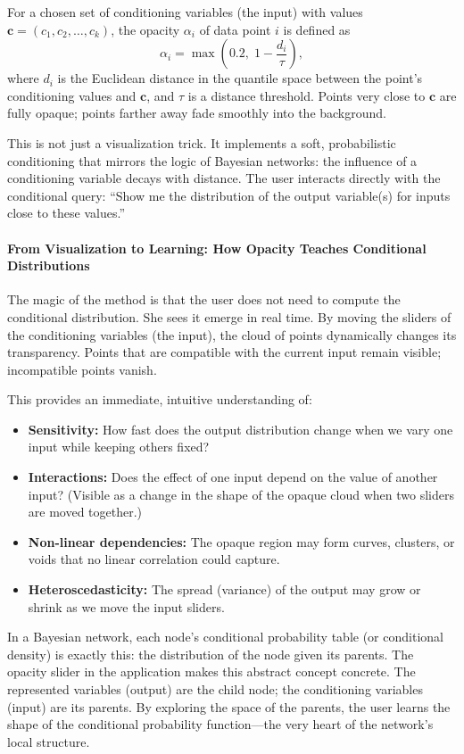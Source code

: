For a chosen set of conditioning variables (the input) with values \(\mathbf{c} = (c_1,c_2,\dots,c_k)\), the opacity \(\alpha_i\) of data point \(i\) is defined as
\[
\alpha_i = \max\!\left(0.2,\; 1-\frac{d_i}{\tau}\right),
\]
where \(d_i\) is the Euclidean distance in the quantile space between the point’s conditioning values and \(\mathbf{c}\), and \(\tau\) is a distance threshold. Points very close to \(\mathbf{c}\) are fully opaque; points farther away fade smoothly into the background.

This is not just a visualization trick. It implements a soft, probabilistic conditioning that mirrors the logic of Bayesian networks: the influence of a conditioning variable decays with distance. The user interacts directly with the conditional query: “Show me the distribution of the output variable(s) for inputs close to these values.”

\paragraph{From Visualization to Learning: How Opacity Teaches Conditional Distributions}
The magic of the method is that the user does not need to compute the conditional distribution. She sees it emerge in real time. By moving the sliders of the conditioning variables (the input), the cloud of points dynamically changes its transparency. Points that are compatible with the current input remain visible; incompatible points vanish.

This provides an immediate, intuitive understanding of:
\begin{itemize}
\item \textbf{Sensitivity:} How fast does the output distribution change when we vary one input while keeping others fixed?
\item \textbf{Interactions:} Does the effect of one input depend on the value of another input? (Visible as a change in the shape of the opaque cloud when two sliders are moved together.)
\item \textbf{Non-linear dependencies:} The opaque region may form curves, clusters, or voids that no linear correlation could capture.
\item \textbf{Heteroscedasticity:} The spread (variance) of the output may grow or shrink as we move the input sliders.
\end{itemize}

In a Bayesian network, each node’s conditional probability table (or conditional density) is exactly this: the distribution of the node given its parents. The opacity slider in the application makes this abstract concept concrete. The represented variables (output) are the child node; the conditioning variables (input) are its parents. By exploring the space of the parents, the user learns the shape of the conditional probability function—the very heart of the network’s local structure.

